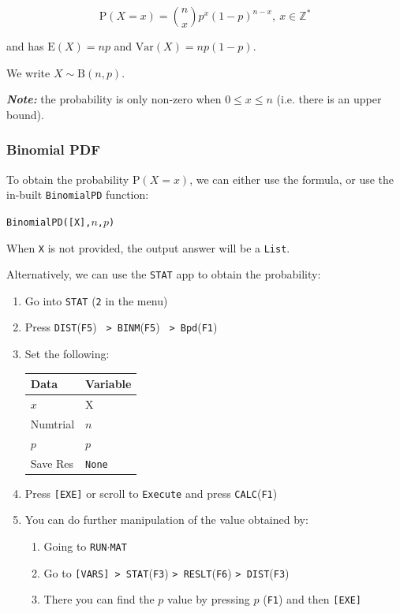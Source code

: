 \documentclass[a5paper]{memoir}
\def\code#1{\texttt{#1}}
\def\note#1{\textcolor[HTML]{109fa9}{\textbf{\textit{Note:}}} #1}
\def\runmat{\code{RUN$\cdot$MAT} }
\def\Fone{(\code{F1}) }
\def\Fthree{(\code{F3}) }
\def\Ffive{(\code{F5}) }
\def\Fsix{(\code{F6}) }
\newcommand{\addtoindex}[1]{#1\index{#1}}
\begin{document}
\begin{equation}
	\mathrm{P}(X=x) = {n \choose x} p^x(1-p)^{n-x},~x \in \mathbb{Z}^*
\end{equation}

and has $\mathrm{E}(X) = np$ and $\mathrm{Var}(X)=np(1-p)$.

We write $X \sim \mathrm{B}(n, p)$.

\note{the probability is only non-zero when $0 \leq x \leq n$ (i.e. there is an upper bound).}

\subsubsection{Binomial PDF}

To obtain the probability $\textrm{P}(X = x)$, we can either use the formula, or use the in-built \code{\addtoindex{BinomialPD}} function:
\begin{center}
	\code{BinomialPD([X],$n$,$p$)}
\end{center}

When \code{X} is not provided, the output answer will be a \code{List}.

Alternatively, we can use the \code{STAT} app to obtain the probability:
\begin{enumerate}
	\item Go into \code{STAT} (\code{2} in the menu)
	\item Press \code{DIST}\Ffive\code{ > BINM}\Ffive\code{ > Bpd}\Fone
	\item Set the following:
	\begin{center}
		\setlength{\tabcolsep}{10pt}
		\renewcommand{\arraystretch}{1.1}
		\begin{tabular}{|l|l|}
			\hline
			Data		& Variable \\
			\hline
			$x$			& X \\
			\hline
			Numtrial	& $n$ \\
			\hline
			$p$			& $p$ \\
			\hline
			Save Res	& \code{None} \\
			\hline
		\end{tabular}
	\end{center}
	\item Press \code{[EXE]} or scroll to \code{Execute} and press \code{CALC}\Fone
	\item You can do further manipulation of the value obtained by:
	\begin{enumerate}
		\item Going to \runmat
		\item Go to \code{[VARS] > STAT}\Fthree\code{> RESLT}\Fsix\code{> DIST}\Fthree
		\item There you can find the $p$ value by pressing $p$ \Fone and then \code{[EXE]}
	\end{enumerate} 
\end{enumerate}
\end{document}
